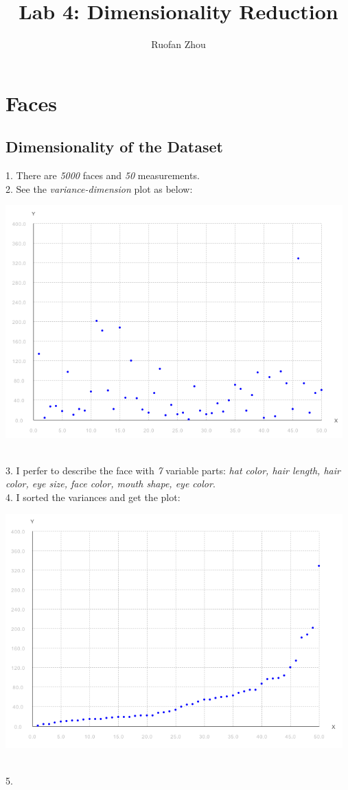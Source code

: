 \documentclass[11pt]{article} %
\title{Lab 4: Dimensionality Reduction}
\author{Ruofan Zhou}
\begin{document}
\maketitle

\section{Faces}
\subsection{Dimensionality of the Dataset}
1. There are \emph{5000} faces and \emph{50} measurements.\\
2.  See the \emph{variance-dimension} plot as below:\\
\centerline{
\includegraphics[width=13cm]{pic/p1}}\\
3. I perfer to describe the face with \emph{7} variable parts: \emph{hat color, hair length, hair color, eye size, face color, mouth shape, eye color}. \\
4. I sorted the variances and get the plot: \\
\centerline{
\includegraphics[width=13cm]{pic/p2}}\\
5.  \\
\end{document}
